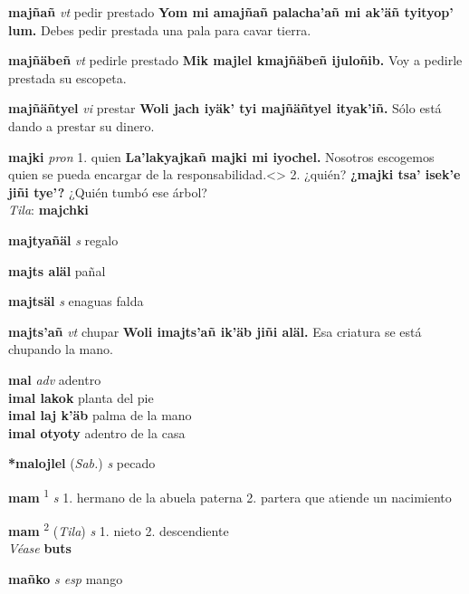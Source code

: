 \documentclass[10pt]{scrbook}
\newcommand{\entry}[1]{\textbf{#1}}
\newcommand{\onedefinition}[1]{#1.}
\newcommand{\defsuperscript}[1]{\textsuperscript{#1}}
\newcommand{\partofspeech}[1]{\textit{#1}}
\newcommand{\spanishtranslation}[1]{#1}
\newcommand{\cholexample}[1]{\textbf{#1}}
\newcommand{\exampletranslation}[1]{#1}
\newcommand{\dialectvariant}[1]{\\\textit{#1}:}
\newcommand{\dialectword}[1]{\textbf{#1}}
\newcommand{\alsosee}[1]{\\\textit{Véase} \textbf{#1}}
\newcommand{\relevantdialect}[1]{(\textit{#1})}
\newcommand{\secondaryentry}[1]{\\\textbf{#1}}
\newcommand{\secondtranslation}[1]{#1}
\begin{document}
\begin{multicols}{2}
\entry{majñañ}
\partofspeech{vt}
\spanishtranslation{pedir prestado}
\cholexample{Yom mi amajñañ palacha'añ mi ak'äñ tyityop' lum.}
\exampletranslation{Debes pedir prestada una pala para cavar tierra.}

\entry{majñäbeñ}
\partofspeech{vt}
\spanishtranslation{pedirle prestado}
\cholexample{Mik majlel kmajñäbeñ ijuloñib.}
\exampletranslation{Voy a pedirle prestada su escopeta.}

\entry{majñäñtyel}
\partofspeech{vi}
\spanishtranslation{prestar}
\cholexample{Woli jach iyäk' tyi majñäñtyel ityak'iñ.}
\exampletranslation{Sólo está dando a prestar su dinero.}

\entry{majki}
\partofspeech{pron}
\onedefinition{1}
\spanishtranslation{quien}
\cholexample{La'lakyajkañ majki mi iyochel.}
\exampletranslation{Nosotros escogemos quien se pueda encargar de la responsabilidad.<>}
\onedefinition{2}
\spanishtranslation{¿quién?}
\cholexample{¿majki tsa' isek'e jiñi tye'?}
\exampletranslation{¿Quién tumbó ese árbol?}
\dialectvariant{Tila}
\dialectword{majchki}

\entry{majtyañäl}
\partofspeech{s}
\spanishtranslation{regalo}

\entry{majts aläl}
\spanishtranslation{pañal}

\entry{majtsäl}
\partofspeech{s}
\spanishtranslation{enaguas}
\spanishtranslation{falda}

\entry{majts'añ}
\partofspeech{vt}
\spanishtranslation{chupar}
\cholexample{Woli imajts'añ ik'äb jiñi aläl.}
\exampletranslation{Esa criatura se está chupando la mano.}

\entry{mal}
\partofspeech{adv}
\spanishtranslation{adentro}
\secondaryentry{imal lakok}
\secondtranslation{planta del pie}
\secondaryentry{imal laj k'äb}
\secondtranslation{palma de la mano}
\secondaryentry{imal otyoty}
\secondtranslation{adentro de la casa}

\entry{*malojlel}
\relevantdialect{Sab.}
\partofspeech{s}
\spanishtranslation{pecado}

\entry{mam}
\defsuperscript{1}
\partofspeech{s}
\onedefinition{1}
\spanishtranslation{hermano de la abuela paterna}
\onedefinition{2}
\spanishtranslation{partera que atiende un nacimiento}

\entry{mam}
\defsuperscript{2}
\relevantdialect{Tila}
\partofspeech{s}
\onedefinition{1}
\spanishtranslation{nieto}
\onedefinition{2}
\spanishtranslation{descendiente}
\alsosee{buts}

\entry{mañko}
\partofspeech{s esp}
\spanishtranslation{mango}


\end{multicols}
\end{document}
